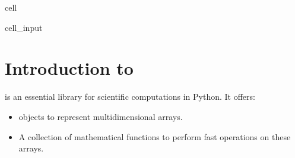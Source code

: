 \documentclass[letterpaper,10pt,english]{jupyterBook}
\begin{document}
\begin{sphinxuseclass}{cell}\begin{sphinxVerbatimInput}

\begin{sphinxuseclass}{cell_input}
\begin{sphinxVerbatim}[commandchars=\\\{\}]
  
 
      
       
           
               
           
              
\end{sphinxVerbatim}

\end{sphinxuseclass}\end{sphinxVerbatimInput}

\end{sphinxuseclass}

\section{Introduction to }
\label{\detokenize{01:introduction-to-numpy}}
\sphinxAtStartPar
{} is an essential library for scientific computations in Python. It offers:
\begin{itemize}
\item {} 
\sphinxAtStartPar
{} objects to represent multi\sphinxhyphen{}dimensional arrays.

\item {} 
\sphinxAtStartPar
A collection of mathematical functions to perform fast operations on these arrays.

\end{itemize}
\end{document}
